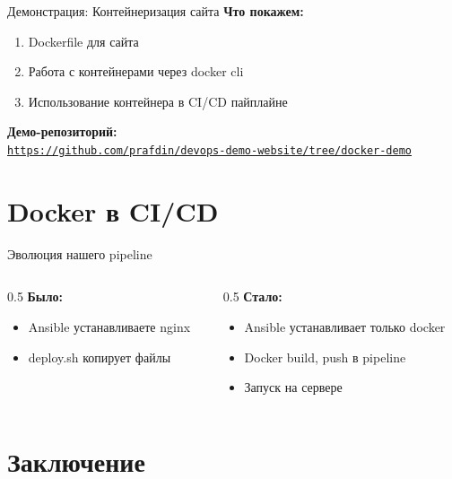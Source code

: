 \documentclass[aspectratio=169]{beamer}
\begin{document}
\begin{frame}{Демонстрация: Контейнеризация сайта}
\textbf{Что покажем:}
\begin{enumerate}
\item Dockerfile для сайта
\item Работа с контейнерами через docker cli
\item Использование контейнера в CI/CD пайплайне
\end{enumerate}

\vspace{0.2cm}

\textbf{Демо-репозиторий:} \\
\href{https://github.com/prafdin/devops-demo-website/tree/docker-demo}{\texttt{https://github.com/prafdin/devops-demo-website/tree/docker-demo}}

\end{frame}

\section{Docker в CI/CD}

\begin{frame}{Эволюция нашего pipeline}
\begin{columns}[t]
\begin{column}[t]{0.5\textwidth}
\textbf{Было:}
\begin{itemize}
\item Ansible устанавливаете nginx
\item deploy.sh копирует файлы
\end{itemize}
\end{column}

\begin{column}[t]{0.5\textwidth}
\textbf{Стало:}
\begin{itemize}
\item Ansible устанавливает только docker
\item Docker build, push в pipeline
\item Запуск на сервере
\end{itemize}
\end{column}
\end{columns}
\end{frame}



\section{Заключение}
\end{document}
